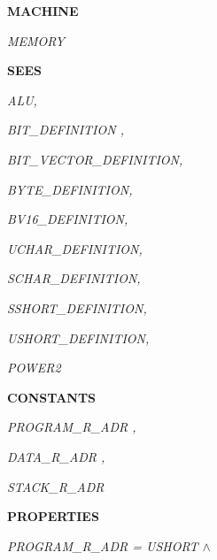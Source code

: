 

 

\bf MACHINE

\hspace*{0.20in}\it MEMORY

\hspace*{0.20in}

\bf SEES

\hspace*{0.20in}\it ALU\rm ,

\hspace*{0.20in}\it BIT\_DEFINITION \rm ,

\hspace*{0.20in}\it BIT\_VECTOR\_DEFINITION\rm ,

\hspace*{0.20in}\it BYTE\_DEFINITION\rm ,

\hspace*{0.20in}\it BV16\_DEFINITION\rm ,

\hspace*{0.20in}

\hspace*{0.20in}\it UCHAR\_DEFINITION\rm ,

\hspace*{0.20in}\it SCHAR\_DEFINITION\rm ,

\hspace*{0.20in}\it SSHORT\_DEFINITION\rm ,

\hspace*{0.20in}\it USHORT\_DEFINITION\rm ,

\hspace*{0.20in}\it POWER2 

\bf CONSTANTS

\hspace*{0.20in}\it PROGRAM\_R\_ADR \rm ,

\hspace*{0.20in}\it DATA\_R\_ADR \rm ,

\hspace*{0.20in}\it STACK\_R\_ADR 

\hspace*{0.20in}

\bf PROPERTIES

\hspace*{0.20in}

\hspace*{0.20in} 

\hspace*{0.20in}\it PROGRAM\_R\_ADR \rm = \it USHORT  $\land$ 

